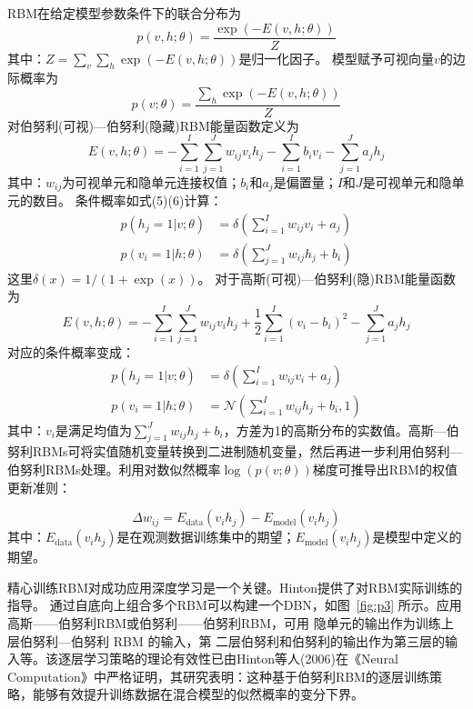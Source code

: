 \documentclass[UTF8]{article}
\begin{document}
RBM在给定模型参数条件下的联合分布为
\begin{equation}
	p(v,h;\theta) = \frac{\exp(-E(v,h;\theta))}{Z} 
	\tag{2}
\end{equation}
其中：\( Z = \sum_v \sum_h \exp(-E(v,h;\theta)) \)是归一化因子。
模型赋予可视向量\( v \)的边际概率为
\begin{equation}
	p(v;\theta) = \frac{\sum_h \exp(-E(v,h;\theta))}{Z}
	\tag{3}
\end{equation}
对伯努利(可视)—伯努利(隐藏)RBM能量函数定义为
\begin{equation}
	E(v,h;\theta) = -\sum_{i=1}^I \sum_{j=1}^J w_{ij}v_i h_j - \sum_{i=1}^I b_i v_i - \sum_{j=1}^J a_j h_j
	\tag{4}
\end{equation}
其中：\( w_{ij} \)为可视单元和隐单元连接权值；\( b_i \)和\( a_j \)是偏置量；\( I \)和\( J \)是可视单元和隐单元的数目。
条件概率如式(5)(6)计算：
\begin{align}
	p(h_j = 1|v;\theta) &= \delta\left( \sum_{i=1}^I w_{ij}v_i + a_j \right)
	\tag{5} \\
	p(v_i = 1|h;\theta) &= \delta\left( \sum_{j=1}^J w_{ij}h_j + b_i \right)
	\tag{6}  
\end{align}
这里\(\delta(x) = 1/(1 + \exp(x))\)。
对于高斯(可视)—伯努利(隐)RBM能量函数为
\begin{equation}
	E(v,h;\theta) = -\sum_{i=1}^I \sum_{j=1}^J w_{ij}v_i h_j + \frac{1}{2} \sum_{i=1}^I (v_i - b_i)^2 - \sum_{j=1}^J a_j h_j
	\tag{7}
\end{equation}
对应的条件概率变成：
\begin{align}
	p(h_j = 1|v;\theta) &= \delta\left( \sum_{i=1}^I w_{ij}v_i + a_j \right)
	\tag{8} \\  
	p(v_i = 1|h;\theta) &= \mathcal{N}\left( \sum_{i=1}^I w_{ij}h_j + b_i, 1 \right)
	\tag{9}  
\end{align}
	其中：\( v_i \)是满足均值为\(\sum_{j=1}^J w_{ij}h_j + b_i\)，方差为1的高斯分布的实数值。高斯—伯努利RBMs可将实值随机变量转换到二进制随机变量，然后再进一步利用伯努利—伯努利RBMs处理。利用对数似然概率\(\log(p(v;\theta))\)梯度可推导出RBM的权值更新准则：
	
	\begin{equation}
		\Delta w_{ij} = E_{\text{data}}(v_i h_j) - E_{\text{model}}(v_i h_j)
		\tag{10}
	\end{equation}
	其中：\( E_{\text{data}}(v_i h_j) \)是在观测数据训练集中的期望；\( E_{\text{model}}(v_i h_j) \)是模型中定义的期望。
	
	精心训练RBM对成功应用深度学习是一个关键。Hinton\cite{v21}提供了对RBM实际训练的指导\label{sec:rbm_training}。
	通过自底向上组合多个RBM可以构建一个DBN，如图~\ref{fig:p3}
	所示。应用高斯——伯努利RBM或伯努利——伯努利RBM，可用
	隐单元的输出作为训练上层伯努利—伯努利 RBM 的输入，第
	二层伯努利和伯努利的输出作为第三层的输入等。该逐层学习策略的理论有效性已由Hinton等人(2006)\cite{v3}在《Neural Computation》中严格证明，其研究表明：这种基于伯努利RBM的逐层训练策略，能够有效提升训练数据在混合模型的似然概率的变分下界。
		
\end{document}
